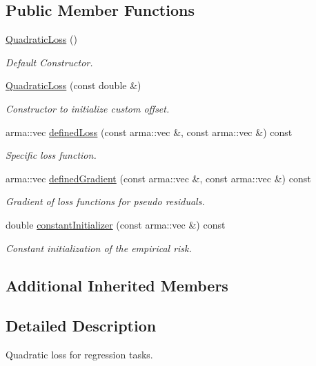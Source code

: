 \subsection*{Public Member Functions}
\begin{DoxyCompactItemize}
\item 
\hyperlink{classloss_1_1_quadratic_loss_acf4a3be5ab3c3aa4d574748c8864bacd}{Quadratic\+Loss} ()
\begin{DoxyCompactList}\small\item\em Default Constructor. \end{DoxyCompactList}\item 
\hyperlink{classloss_1_1_quadratic_loss_a41fd44734dc6d4f4189e02c79bcf4095}{Quadratic\+Loss} (const double \&)
\begin{DoxyCompactList}\small\item\em Constructor to initialize custom offset. \end{DoxyCompactList}\item 
arma\+::vec \hyperlink{classloss_1_1_quadratic_loss_ae34f68243ffe021e309ed73a68796e1e}{defined\+Loss} (const arma\+::vec \&, const arma\+::vec \&) const
\begin{DoxyCompactList}\small\item\em Specific loss function. \end{DoxyCompactList}\item 
arma\+::vec \hyperlink{classloss_1_1_quadratic_loss_adb4da1acbad702b5ba8570abaa17d373}{defined\+Gradient} (const arma\+::vec \&, const arma\+::vec \&) const
\begin{DoxyCompactList}\small\item\em Gradient of loss functions for pseudo residuals. \end{DoxyCompactList}\item 
double \hyperlink{classloss_1_1_quadratic_loss_a43989f3fbecc27351513afe1136cdf38}{constant\+Initializer} (const arma\+::vec \&) const
\begin{DoxyCompactList}\small\item\em Constant initialization of the empirical risk. \end{DoxyCompactList}\end{DoxyCompactItemize}
\subsection*{Additional Inherited Members}


\subsection{Detailed Description}
Quadratic loss for regression tasks. 

